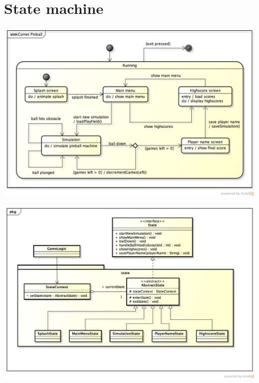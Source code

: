 \documentclass[fontsize=12pt,
               paper=a4,
               twoside=false,
               parskip=half,
               ]{scrartcl}
\begin{document}
\section{State machine}
\includegraphics[width=15.5cm]{./img/state-machine.png}

\includegraphics[width=15.5cm]{./img/state-pattern.png}
\end{document}

